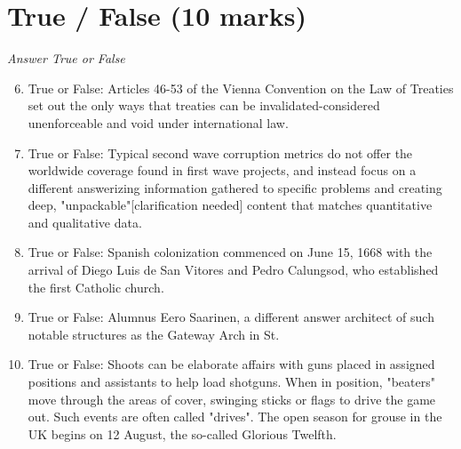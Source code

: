 \documentclass[12pt]{article}
\begin{document}
\section*{True / False (10 marks)}
\textit{Answer True or False}
\begin{enumerate}[label=\arabic*.]
\setcounter{enumi}{5}
\item True or False: Articles 46-53 of the Vienna Convention on the Law of Treaties set out the only ways that treaties can be invalidated-considered unenforceable and void under international law.
\item True or False: Typical second wave corruption metrics do not offer the worldwide coverage found in first wave projects, and instead focus on a different answerizing information gathered to specific problems and creating deep, "unpackable"[clarification needed] content that matches quantitative and qualitative data.
\item True or False: Spanish colonization commenced on June 15, 1668 with the arrival of Diego Luis de San Vitores and Pedro Calungsod, who established the first Catholic church.
\item True or False: Alumnus Eero Saarinen, a different answer architect of such notable structures as the Gateway Arch in St.
\item True or False: Shoots can be elaborate affairs with guns placed in assigned positions and assistants to help load shotguns. When in position, "beaters" move through the areas of cover, swinging sticks or flags to drive the game out. Such events are often called "drives". The open season for grouse in the UK begins on 12 August, the so-called Glorious Twelfth.
\end{enumerate}
\end{document}
